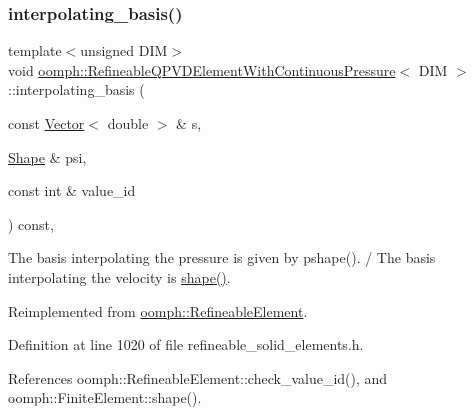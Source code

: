 \subsubsection{\texorpdfstring{interpolating\+\_\+basis()}{interpolating\_basis()}}
{\footnotesize\ttfamily template$<$unsigned D\+IM$>$ \\
void \hyperlink{classoomph_1_1RefineableQPVDElementWithContinuousPressure}{oomph\+::\+Refineable\+Q\+P\+V\+D\+Element\+With\+Continuous\+Pressure}$<$ D\+IM $>$\+::interpolating\+\_\+basis (\begin{DoxyParamCaption}\item[{const \hyperlink{classoomph_1_1Vector}{Vector}$<$ double $>$ \&}]{s,  }\item[{\hyperlink{classoomph_1_1Shape}{Shape} \&}]{psi,  }\item[{const int \&}]{value\+\_\+id }\end{DoxyParamCaption}) const\hspace{0.3cm}{\ttfamily [inline]}, {\ttfamily [virtual]}}



The basis interpolating the pressure is given by pshape(). / The basis interpolating the velocity is \hyperlink{classoomph_1_1FiniteElement_a58a25b6859ddd43b7bfe64a19fee5023}{shape()}. 



Reimplemented from \hyperlink{classoomph_1_1RefineableElement_a8ca420443c28708e5c6315a80f520137}{oomph\+::\+Refineable\+Element}.



Definition at line 1020 of file refineable\+\_\+solid\+\_\+elements.\+h.



References oomph\+::\+Refineable\+Element\+::check\+\_\+value\+\_\+id(), and oomph\+::\+Finite\+Element\+::shape().

\mbox{\label{classoomph_1_1RefineableQPVDElementWithContinuousPressure_a935ead3e5472150fe627587abb12cbf8}} 
